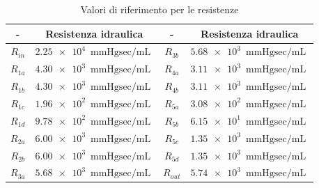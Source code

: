 \documentclass{article}
\begin{document}
\begin{table}[h!]
\begin{center}
\begin{tabular}{| c | c || c | c |}
\hline
- & \textbf{Resistenza idraulica} & - & \textbf{Resistenza idraulica}\\
\hline
$R_{in}$ & $\SI{2.25e4}{\mmHg \sec \per \milli \liter}$ & $R_{3b}$ & $ \SI{5.68e3}{\mmHg \sec \per \milli \liter}$ \\
$R_{1a}$ & $\SI{4.30e3}{\mmHg \sec \per \milli \liter}$ & $R_{4a}$ & $ \SI{3.11e3}{\mmHg \sec \per \milli \liter}$ \\
$R_{1b}$ & $ \SI{4.30e3}{\mmHg \sec \per \milli \liter}$ & $R_{4b}$ & $ \SI{3.11e3}{\mmHg \sec \per \milli \liter}$ \\
$R_{1c}$ & $ \SI{1.96e2}{\mmHg \sec \per \milli \liter}$ & $R_{5a}$ & $ \SI{3.08e2}{\mmHg \sec \per \milli \liter}$ \\
$R_{1d}$ & $ \SI{9.78e2}{\mmHg \sec \per \milli \liter}$ & $R_{5b}$ & $ \SI{6.15e1}{\mmHg \sec \per \milli \liter}$ \\
$R_{2a}$ & $ \SI{6.00e3}{\mmHg \sec \per \milli \liter}$ & $R_{5c}$ & $ \SI{1.35e3}{\mmHg \sec \per \milli \liter}$ \\
$R_{2b}$ & $ \SI{6.00e3}{\mmHg \sec \per \milli \liter}$ & $R_{5d}$ & $ \SI{1.35e3}{\mmHg \sec \per \milli \liter}$ \\
$R_{3a}$ & $ \SI{5.68e3}{\mmHg \sec \per \milli \liter}$ & $R_{out}$ & $ \SI{5.74e3}{\mmHg \sec \per \milli \liter}$ \\

\hline
\end{tabular}
\caption{Valori di riferimento per le resistenze}
\label{tab_resistori}
\end{center}
\end{table}
\end{document}
